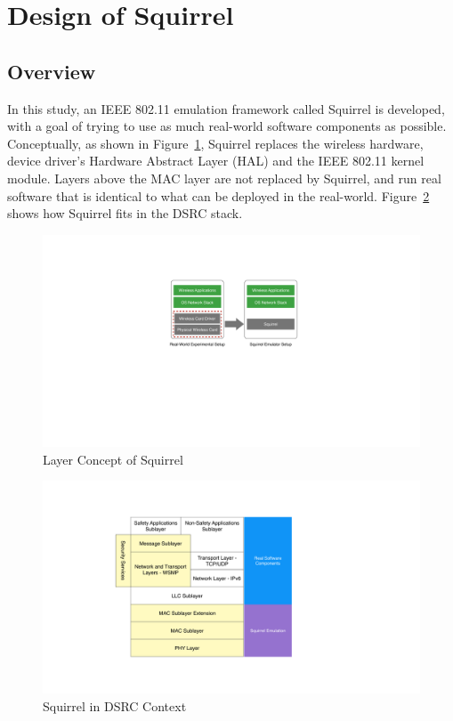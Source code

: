\documentclass[12pt]{report}
\begin{document}
\section{Design of Squirrel}
\subsection{Overview}

In this study, an IEEE 802.11 emulation framework called Squirrel is developed, with a goal of trying to use as much real-world software components as possible. Conceptually, as shown in Figure~\ref{fig:squirrel_concept}, Squirrel replaces the wireless hardware, device driver's Hardware Abstract Layer (HAL) and the IEEE 802.11 kernel module. Layers above the MAC layer are not replaced by Squirrel, and run real software that is identical to what can be deployed in the real-world. Figure~\ref{fig:squirrel_dsrc} shows how Squirrel fits in the DSRC stack.

\begin{figure}[h]
  \begin{center}
    \includegraphics[width=.7\textwidth]{figures/squirrelConcept.pdf}
    \caption{\label{fig:squirrel_concept}Layer Concept of Squirrel}
  \end{center}
\end{figure}

\begin{figure}[h]
  \begin{center}
    \includegraphics[width=.7\textwidth]{figures/squirrelDSRC.pdf}
    \caption{\label{fig:squirrel_dsrc}Squirrel in DSRC Context}
  \end{center}
\end{figure}
\end{document}
